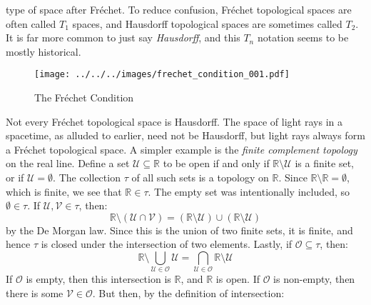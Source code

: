 \documentclass{article}
\theoremstyle{plain}
\theoremstyle{normal}
\newenvironment{example}{%
    \pushQED{\qed}\renewcommand{\qedsymbol}{$\blacksquare$}\examplex%
}{%
    \popQED\endexamplex%
}
\begin{document}
    type of space after Fr\'{e}chet. To reduce confusion,
    Fr\'{e}chet topological spaces are often called $T_{1}$ spaces, and
    Hausdorff topological spaces are sometimes called $T_{2}$. It is far
    more common to just say \textit{Hausdorff}, and this $T_{n}$ notation seems
    to be mostly historical.
    \begin{figure}
        \centering
        \texttt{[image: ../../../images/frechet\_condition\_001.pdf]}
        \caption{The Fr\'{e}chet Condition}
        \label{fig:frechet_condition_001}
    \end{figure}
    \begin{example}[\textbf{Finite Complement Topology}]
        Not every Fr\'{e}chet topological space is Hausdorff. The space of
        light rays in a spacetime, as alluded to earlier, need not be
        Hausdorff, but light rays always form a Fr\'{e}chet topological
        space. A simpler example is the \textit{finite complement topology}
        on the real line. Define a set $\mathcal{U}\subseteq\mathbb{R}$ to be
        open if and only if $\mathbb{R}\setminus\mathcal{U}$ is a finite set,
        or if $\mathcal{U}=\emptyset$.
        The collection $\tau$ of all such sets is a topology on $\mathbb{R}$.
        Since $\mathbb{R}\setminus\mathbb{R}=\emptyset$, which is finite,
        we see that $\mathbb{R}\in\tau$. The empty set was intentionally
        included, so $\emptyset\in\tau$. If $\mathcal{U},\mathcal{V}\in\tau$,
        then:
        \begin{equation}
            \mathbb{R}\setminus(\mathcal{U}\cap\mathcal{V})=
                (\mathbb{R}\setminus\mathcal{U})\cup
                (\mathbb{R}\setminus\mathcal{U})
        \end{equation}
        by the De Morgan law. Since this is the union of two finite sets, it
        is finite, and hence $\tau$ is closed under the intersection of two
        elements. Lastly, if $\mathcal{O}\subseteq\tau$, then:
        \begin{equation}
            \mathbb{R}\setminus\bigcup_{\mathcal{U}\in\mathcal{O}}\mathcal{U}
            =\bigcap_{\mathcal{U}\in\mathcal{O}}\mathbb{R}\setminus\mathcal{U}
        \end{equation}
        If $\mathcal{O}$ is empty, then this intersection is $\mathbb{R}$,
        and $\mathbb{R}$ is open. If $\mathcal{O}$ is non-empty, then there is
        some $\mathcal{V}\in\mathcal{O}$. But then, by the definition of
        intersection:
        \begin{equation}

\end{equation}
\end{example}
\end{document}

